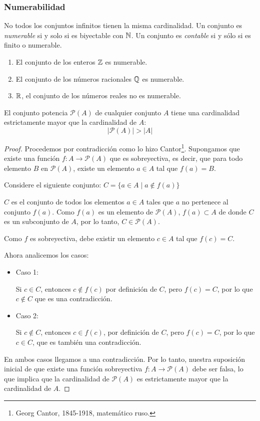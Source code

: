 \subsubsection{Numerabilidad}
No todos los conjuntos infinitos tienen la misma cardinalidad. Un conjunto es \textit{numerable} si y solo si es biyectable con $\mathbb{N}$. Un conjunto es \textit{contable} si y sólo si es finito o numerable.

\begin{fmd-example}
	\begin{enumerate}
		\item El conjunto de los enteros $\mathbb{Z}$ es numerable.
		\item El conjunto de los números racionales $\mathbb{Q}$ es numerable.
		\item $\mathbb{R}$, el conjunto de los números reales no es numerable.
	\end{enumerate}
\end{fmd-example}

\begin{fmd-theorem}  
	El conjunto potencia $\mathcal{P}(A)$ de cualquier conjunto $A$ tiene una cardinalidad estrictamente mayor que la cardinalidad de $A$:
	\[ |\mathcal{P}(A)| >  |A| \]
	
	\begin{proof}
		Procedemos por contradicción como lo hizo Cantor\footnote{Georg Cantor, 1845-1918, matemático ruso.}. Supongamos que existe una función $f: A \rightarrow \mathcal{P}(A)$ que es sobreyectiva, es decir, que para todo elemento $B$ en $\mathcal{P}(A)$, existe un elemento $a \in A$ tal que $f(a) = B$.
		
		Considere el siguiente conjunto: $ C = \{ a \in A \mid a \not \in f(a) \} $
		
		$C$ es el conjunto de todos los elementos $a \in A$ tales que $a$ no pertenece al conjunto $f(a)$.
		Como $f(a)$ es un elemento de $\mathcal{P}(A)$, $f(a) \subset A$ de donde $C$ es un subconjunto de $A$, por lo tanto, $C \in \mathcal{P}(A)$.
		
		Como $f$ es sobreyectiva, debe existir un elemento $c \in A$ tal que $f(c) = C$.
		
		Ahora analicemos los casos:
		
		\begin{itemize}
			\item Caso 1:
			
			 Si $c \in C$, entonces $c \not \in f(c)$ por definición de $C$, pero $f(c) = C$, por lo que $c \not \in C$ que es una contradicción.
			\item Caso 2:
			
			Si $c \not \in C$, entonces $c \in f(c)$, por definición de $C$, pero $f(c) = C$, por lo que $c \in C$, que es también una contradicción.
		\end{itemize}
		En ambos casos llegamos a una contradicción. Por lo tanto, nuestra suposición inicial de que existe una función sobreyectiva $f: A \rightarrow \mathcal{P}(A)$ debe ser falsa, lo que implica que la cardinalidad de $\mathcal{P}(A)$ es estrictamente mayor que la cardinalidad de $A$.
	\end{proof}
\end{fmd-theorem}